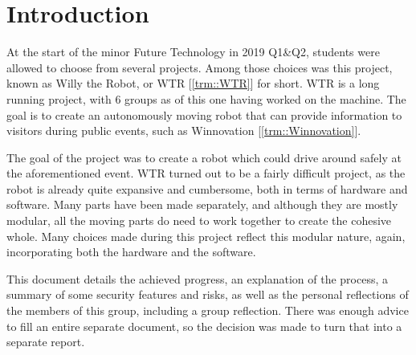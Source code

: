 \section{Introduction}
At the start of the minor Future Technology in 2019 Q1\&Q2, students were allowed to choose from several projects.
Among those choices was this project, known as Willy the Robot, or WTR [\ref{trm::WTR}] for short.
WTR is a long running project, with 6 groups as of this one having worked on the machine.
The goal is to create an autonomously moving robot that can provide information to visitors during public events, such as Winnovation [\ref{trm::Winnovation}].

The goal of the project was to create a robot which could drive around safely at the aforementioned event.
WTR turned out to be a fairly difficult project, as the robot is already quite expansive and cumbersome, both in terms of hardware and software.
Many parts have been made separately, and although they are mostly modular, all the moving parts do need to work together to create the cohesive whole.
Many choices made during this project reflect this modular nature, again, incorporating both the hardware and the software.

This document details the achieved progress, an explanation of the process, a summary of some security features and risks, as well as the personal reflections of the members of this group, including a group reflection.
There was enough advice to fill an entire separate document, so the decision was made to turn that into a separate report.

\newpage
